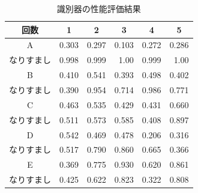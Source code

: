 \begin{table}[btph]
  \centering
  \caption{識別器の性能評価結果}
  \label{auth-result}
  \begin{tabular}{|c|r|r|r|r|r|} \hline
    \multicolumn{1}{|c|}{回数} & \multicolumn{1}{c|}{1} & \multicolumn{1}{c|}{2} & \multicolumn{1}{c|}{3} & \multicolumn{1}{c|}{4} & \multicolumn{1}{c|}{5} \\ \hline
    A & 0.303 & 0.297 & 0.103 & 0.272 & 0.286 \\
    なりすまし & 0.998 & 0.999 & 1.00 & 0.999 & 1.00 \\ \hline
    B & 0.410 & 0.541 & 0.393 & 0.498 & 0.402 \\
    なりすまし & 0.390 & 0.954 & 0.714 & 0.986 & 0.771 \\ \hline
    C & 0.463 & 0.535 & 0.429 & 0.431 & 0.660 \\ %
    なりすまし & 0.511 & 0.573 & 0.585 & 0.408 & 0.897 \\ \hline
    D & 0.542 & 0.469 & 0.478 & 0.206 & 0.316 \\
    なりすまし & 0.517 & 0.790 & 0.860 & 0.665 & 0.366 \\ \hline
    E & 0.369 & 0.775 & 0.930 & 0.620 & 0.861 \\
    なりすまし & 0.425 & 0.622 & 0.823 & 0.322 & 0.808 \\ \hline

\end{tabular}
\end{table}
